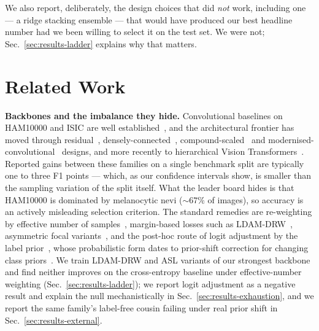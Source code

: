 \documentclass[journal]{IEEEtran}
\begin{document}
We also report, deliberately, the design choices that did \emph{not} work, including one
--- a ridge stacking ensemble --- that would have produced our best headline number had we
been willing to select it on the test set. We were not; Sec.~\ref{sec:results-ladder}
explains why that matters.

\section{Related Work}

\textbf{Backbones and the imbalance they hide.} Convolutional baselines on HAM10000 and ISIC
are well established~\cite{esteva2017,codella2018isic,tschandl2018ham10000}, and the
architectural frontier has moved through residual~\cite{he2016resnet},
densely-connected~\cite{huang2017densenet}, compound-scaled~\cite{tan2019efficientnet} and
modernised-convolutional~\cite{liu2022convnext} designs, and more recently to hierarchical
Vision Transformers~\cite{liu2022swinv2,tu2022maxvit}. Reported gains between these families
on a single benchmark split are typically one to three F1 points --- which, as our confidence
intervals show, is smaller than the sampling variation of the split itself. What the leader
board hides is that HAM10000 is dominated by melanocytic nevi ($\sim67\%$ of images), so
accuracy is an actively misleading selection criterion. The standard remedies are
re-weighting by effective number of samples~\cite{cui2019classbalanced}, margin-based losses
such as LDAM-DRW~\cite{cao2019ldam}, asymmetric focal variants~\cite{ridnik2021asl}, and the
post-hoc route of logit adjustment by the label prior~\cite{menon2021logitadjust}, whose
probabilistic form dates to prior-shift correction for changing class
priors~\cite{saerens2002adjusting}. We train LDAM-DRW and ASL variants of our strongest
backbone and find neither improves on the cross-entropy baseline under effective-number
weighting (Sec.~\ref{sec:results-ladder}); we report logit adjustment as a negative result
and explain the null mechanistically in Sec.~\ref{sec:results-exhaustion}, and we report the
same family's label-free cousin failing under real prior shift in
Sec.~\ref{sec:results-external}.
\end{document}
